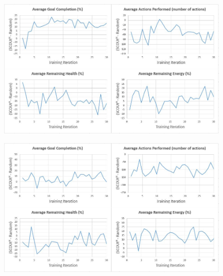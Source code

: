 \begin{appxfig}[H]
\begin{figure}[H]
  \centering
  \includegraphics[width=0.9\columnwidth]{Figures/Results/TrainingVariation1/MapWater.JPG}
\end{figure}
\caption{Iteration testing performance results for $SCOUt_{MW}$ attempting \textit{Map Water} using setup variation 1 (see subsection~\ref{subsec:training_variations}). All graphs show the controller's average difference in performance compared to $Random$ ($SCOUt_{MW}$ average - $Random$ average) VS the number of training iterations completed.}
\label{appendix:mapwater_training_variation1}
\end{appxfig}


\begin{appxfig}[H]
\begin{figure}[H]
  \centering
  \includegraphics[width=0.9\columnwidth]{Figures/Results/TrainingVariation1/Hybrid-FindHuman.JPG}
\end{figure}
\caption{Iteration testing performance results for $SCOUt_{H}$ attempting \textit{Find Human} using setup variation 1 (see subsection~\ref{subsec:training_variations}). All graphs show the controller's average difference in performance compared to $Random$ ($SCOUt_{H}$ average - $Random$ average) VS the number of training iterations completed.}
\label{appendix:hybrid_training_fh_variation1}
\end{appxfig}


